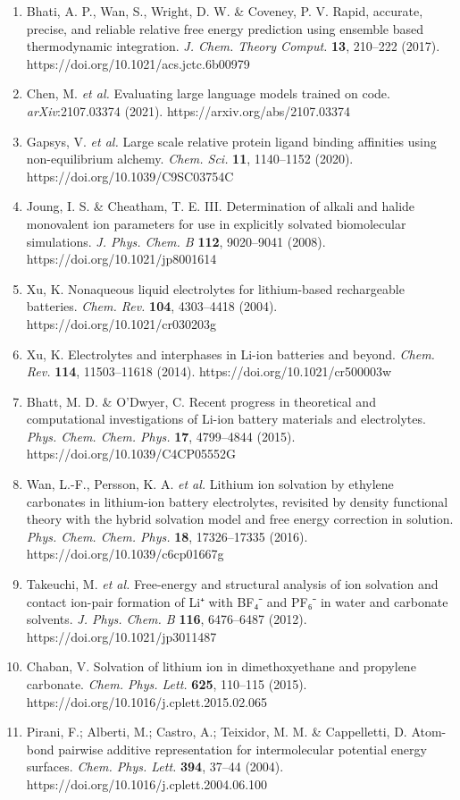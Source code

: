 \documentclass[
  11pt,
]{article}
\begin{document}
\begin{enumerate}
{  Phys. Lett.} \textbf{222}, 529--539 (1994).
  https://doi.org/10.1016/0009-2614(94)00397-1
\item
  Bhati, A. P., Wan, S., Wright, D. W. \& Coveney, P. V. Rapid,
  accurate, precise, and reliable relative free energy prediction using
  ensemble based thermodynamic integration. \emph{J. Chem. Theory
  Comput.} \textbf{13}, 210--222 (2017).
  https://doi.org/10.1021/acs.jctc.6b00979
\item
  Chen, M. \emph{et al.} Evaluating large language models trained on
  code. \emph{arXiv}:2107.03374 (2021). https://arxiv.org/abs/2107.03374
\item
  Gapsys, V. \emph{et al.} Large scale relative protein ligand binding
  affinities using non-equilibrium alchemy. \emph{Chem. Sci.}
  \textbf{11}, 1140--1152 (2020). https://doi.org/10.1039/C9SC03754C
\item
  Joung, I. S. \& Cheatham, T. E. III. Determination of alkali and
  halide monovalent ion parameters for use in explicitly solvated
  biomolecular simulations. \emph{J. Phys. Chem. B} \textbf{112},
  9020--9041 (2008). https://doi.org/10.1021/jp8001614
\item
  Xu, K. Nonaqueous liquid electrolytes for lithium-based rechargeable
  batteries. \emph{Chem. Rev.} \textbf{104}, 4303--4418 (2004).
  https://doi.org/10.1021/cr030203g
\item
  Xu, K. Electrolytes and interphases in Li-ion batteries and beyond.
  \emph{Chem. Rev.} \textbf{114}, 11503--11618 (2014).
  https://doi.org/10.1021/cr500003w
\item
  Bhatt, M. D. \& O'Dwyer, C. Recent progress in theoretical and
  computational investigations of Li-ion battery materials and
  electrolytes. \emph{Phys. Chem. Chem. Phys.} \textbf{17}, 4799--4844
  (2015). https://doi.org/10.1039/C4CP05552G
\item
  Wan, L.-F., Persson, K. A. \emph{et al.} Lithium ion solvation by
  ethylene carbonates in lithium-ion battery electrolytes, revisited by
  density functional theory with the hybrid solvation model and free
  energy correction in solution. \emph{Phys. Chem. Chem. Phys.}
  \textbf{18}, 17326--17335 (2016). https://doi.org/10.1039/c6cp01667g
\item
  Takeuchi, M. \emph{et al.} Free-energy and structural analysis of ion
  solvation and contact ion-pair formation of Li⁺ with BF₄⁻ and PF₆⁻ in
  water and carbonate solvents. \emph{J. Phys. Chem. B} \textbf{116},
  6476--6487 (2012). https://doi.org/10.1021/jp3011487
\item
  Chaban, V. Solvation of lithium ion in dimethoxyethane and propylene
  carbonate. \emph{Chem. Phys. Lett.} \textbf{625}, 110--115 (2015).
  https://doi.org/10.1016/j.cplett.2015.02.065
\item
  Pirani, F.; Alberti, M.; Castro, A.; Teixidor, M. M. \& Cappelletti,
  D. Atom-bond pairwise additive representation for intermolecular
  potential energy surfaces. \emph{Chem. Phys. Lett.} \textbf{394},
  37--44 (2004). https://doi.org/10.1016/j.cplett.2004.06.100
\end{enumerate}
\end{document}
